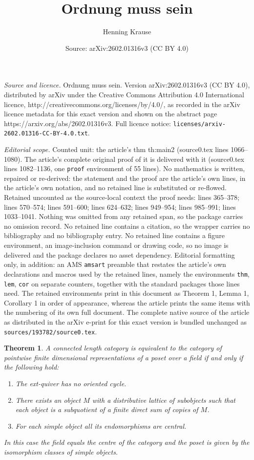 \documentclass[10pt,a4paper]{amsart}
\title{Ordnung muss sein}
\author{Henning Krause}
\date{Source: arXiv:2602.01316v3 (CC BY 4.0)}
\newtheorem{thm}{Theorem}
\begin{document}
\maketitle

\noindent\emph{Source and licence.} Ordnung muss sein. Version arXiv:2602.01316v3 (CC BY 4.0), distributed by arXiv under the Creative Commons Attribution 4.0 International licence, http://creativecommons.org/licenses/by/4.0/, as recorded in the arXiv licence metadata for this exact version and shown on the abstract page https://arxiv.org/abs/2602.01316v3. Full licence notice: \texttt{licenses/arxiv-2602.01316-CC-BY-4.0.txt}.\par\smallskip

\noindent\textit{Editorial scope.} Counted unit: the article's thm th:main2 (source0.tex lines 1066--1080). The article's complete original proof of it is delivered with it (source0.tex lines 1082--1136, one \texttt{proof} environment of 55 lines). No mathematics is written, repaired or re-derived: the statement and the proof are the article's own lines, in the article's own notation, and no retained line is substituted or re-flowed.  Retained uncounted as the source-local context the proof needs: lines 365--378; lines 570--574; lines 591--600; lines 624--632; lines 949--954; lines 985--991; lines 1033--1041.  Nothing was omitted from any retained span, so the package carries no omission record.  No retained line contains a citation, so the wrapper carries no bibliography and no bibliography entry.  No retained line contains a figure environment, an image-inclusion command or drawing code, so no image is delivered and the package declares no asset dependency.  Editorial formatting only, in addition: an AMS \texttt{amsart} preamble that restates the article's own declarations and macros used by the retained lines, namely the environments \texttt{thm}, \texttt{lem}, \texttt{cor} on separate counters, together with the standard packages those lines need.  The retained environments print in this document as Theorem 1, Lemma 1, Corollary 1 in order of appearance, whereas the article prints the same items with the numbering of its own full document.  The complete native source of the article as distributed in the arXiv e-print for this exact version is bundled unchanged as \texttt{sources/193782/source0.tex}.
\begin{thm}\label{th:main}
  A connected length category is equivalent to the category of
  pointwise finite dimensional representations of a poset over a field
  if and only if the following hold:
  \begin{enumerate}
  \item[(L1)] The ext-quiver  has no oriented cycle.
  \item[(L2)] There exists an object $M$ with a distributive lattice of
    subobjects such that each object is a subquotient of a finite
    direct sum of copies of $M$.
  \item[(L3)] For each simple object all its endomorphisms are central. 
\end{enumerate}
In this case the field equals the centre of the category and the poset
is given by the isomorphism classes of simple objects.
\end{thm}
\end{document}
